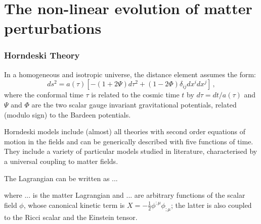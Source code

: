 \chapter{The non-linear evolution of matter perturbations \label{chap:nonlinear}} %








\subsection{Horndeski Theory}


In a homogeneous and isotropic universe, the distance element
assumes the form: 
\begin{equation}
ds^{2}=a(\tau)[-(1+2\Psi)d\tau^{2}+(1-2\Phi)\delta_{ij}dx^{i}dx^{j}]\,,
\end{equation}
where the conformal time $\tau$ is related to the cosmic time $t$
by $d\tau=d t/a(\tau)$ and $\Psi$ and $\Phi$ are the two scalar
gauge invariant gravitational potentials, related (modulo sign) to
the Bardeen potentials.

Horndeski models include (almost) all theories
with second order equations of motion in the fields and can be generically
described with five functions of time. They include a variety of particular
models studied in literature, characterised by a universal coupling
to matter fields.

The Lagrangian can be written as ...

where ... is the matter Lagrangian and ... are arbitrary functions
of the scalar field $\phi$, whose canonical kinetic term is $X=-\frac{1}{2}\phi^{;\mu}\phi_{;\mu}$;
the latter is also coupled to the Ricci scalar and the Einstein tensor.

